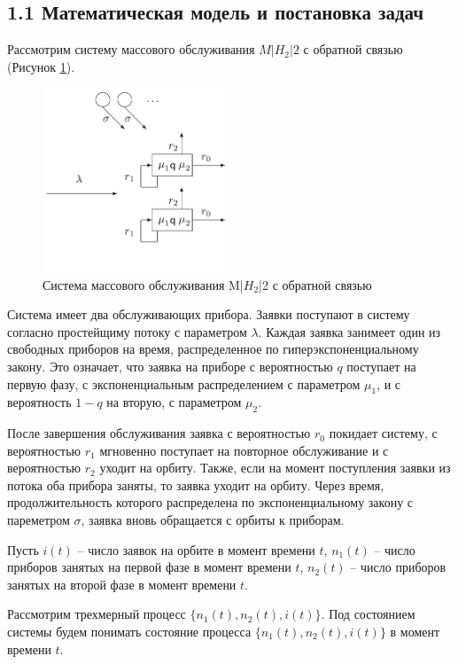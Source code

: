 \subsection{1.1 Математическая модель и постановка задач}
Рассмотрим систему массового обслуживания $M|H_2|2$ с обратной связью (Рисунок \ref{fig:system2}).
\begin{figure}[htbp]
	\centering
	\includegraphics[width=0.5\textwidth]{system2}
	\caption{Система массового обслуживания M|$H_{2}$|2 с обратной связью}
	\label{fig:system2}
\end{figure}


Система имеет два обслуживающих прибора. Заявки поступают в систему согласно простейщиму потоку с параметром $\lambda$. Каждая заявка занимеет один из свободных приборов на время, распределенное по гиперэкспоненциальному закону. Это означает, что заявка на приборе с вероятностью $q$ поступает на первую фазу, с экспоненциальным распределением с параметром $\mu_{1}$, и с вероятность $1-q$ на вторую, с параметром $\mu_{2}$.

После завершения обслуживания заявка с вероятностью $r_{0}$ покидает систему, с вероятностью $r_{1}$ мгновенно поступает на повторное обслуживание и с вероятностью $r_{2}$ уходит на орбиту. Также, если на момент поступления заявки из потока оба прибора заняты, то заявка уходит на орбиту. Через время, продолжительность которого распределена по экспоненциальному закону с пареметром $\sigma$, заявка вновь обращается с орбиты к приборам.

Пусть $i(t)$ -- число заявок на орбите в момент времени $t$, 
$n_{1}(t)$ -- число приборов занятых на первой фазе в момент времени $t$,
$n_{2}(t)$ -- число приборов занятых на второй фазе в момент времени $t$.

Рассмотрим трехмерный процесс $\{n_{1}(t), n_{2}(t), i(t)\}$. Под состоянием системы будем понимать состояние процесса $\{n_{1}(t), n_{2}(t), i(t)\}$ в момент времени $t$.


